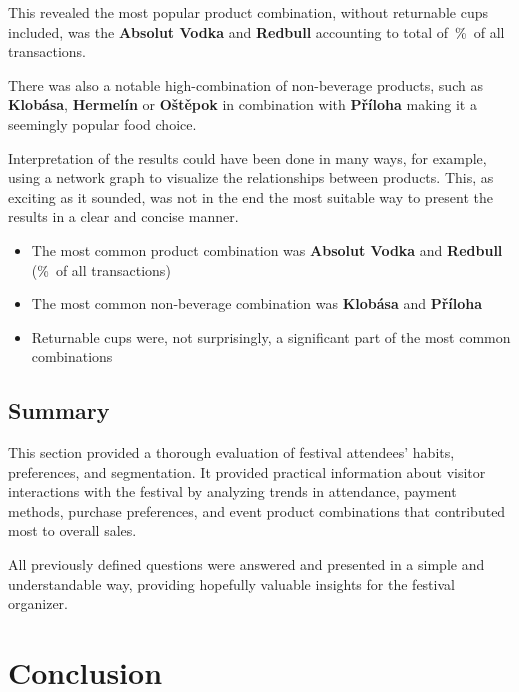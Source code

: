 This revealed the most popular product combination, without returnable cups included, was the \textbf{Absolut Vodka} and \textbf{Redbull} accounting to total of~\%~of all transactions.

There was also a notable high-combination of non-beverage products, such as \textbf{Klobása}, \textbf{Hermelín} or \textbf{Oštěpok} in combination with \textbf{Příloha} making it a seemingly popular food choice.

Interpretation of the results could have been done in many ways, for example, using a network graph to visualize the relationships between products.
This, as exciting as it sounded, was not in the end the most suitable way to present the results in a clear and concise manner.

\begin{keytakeaways}
	\begin{itemize}
		\item The most common product combination was \textbf{Absolut Vodka} and \textbf{Redbull} (\%~of all transactions)
		\item The most common non-beverage combination was \textbf{Klobása} and \textbf{Příloha}
		\item Returnable cups were, not surprisingly, a significant part of the most common combinations
	\end{itemize}
\end{keytakeaways}

\subsection{Summary}
\label{subsec:analysis-customer-summary}

This section provided a thorough evaluation of festival attendees' habits, preferences, and segmentation.
It provided practical information about visitor interactions with the festival by analyzing trends in attendance, payment methods, purchase preferences, and event product combinations that contributed most to overall sales.

All previously defined questions were answered and presented in a simple and understandable way, providing hopefully valuable insights for the festival organizer.



\section{Conclusion}
\label{sec:analysis-conclusion}

